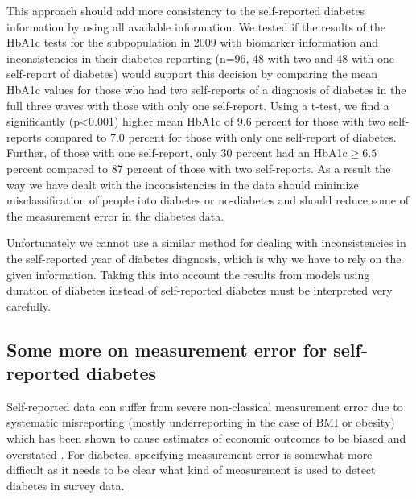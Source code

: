 This approach should add more consistency to the self-reported diabetes
information by using all available information. We tested if the results
of the \ac{HbA1c} tests for the subpopulation in 2009 with biomarker
information and inconsistencies in their diabetes reporting (n=96,
48 with two and 48 with one self-report of diabetes) would support
this decision by comparing the mean \ac{HbA1c} values for those who
had two self-reports of a diagnosis of diabetes in the full three
waves with those with only one self-report. Using a t-test, we find
a significantly (p<0.001) higher mean \ac{HbA1c} of 9.6 percent for
those with two self-reports compared to 7.0 percent for those with
only one self-report of diabetes. Further, of those with one self-report,
only 30 percent had an \ac{HbA1c}$\geqslant6.5$percent compared
to 87 percent of those with two self-reports. As a result the way
we have dealt with the inconsistencies in the data should minimize
misclassification of people into diabetes or no-diabetes and should
reduce some of the measurement error in the diabetes data. 

Unfortunately we cannot use a similar method for dealing with inconsistencies
in the self-reported year of diabetes diagnosis, which is why we have
to rely on the given information. Taking this into account the results
from models using duration of diabetes instead of self-reported diabetes
must be interpreted very carefully.


\subsection{Some more on measurement error for self-reported diabetes}

Self-reported data can suffer from severe non-classical measurement
error due to systematic misreporting (mostly underreporting in the
case of \ac{BMI} or obesity) which has been shown to cause estimates
of economic outcomes to be biased and overstated \citep{Cawley2015,ONeill2013,Perks2015}.
For diabetes, specifying measurement error is somewhat more difficult
as it needs to be clear what kind of measurement is used to detect
diabetes in survey data.

